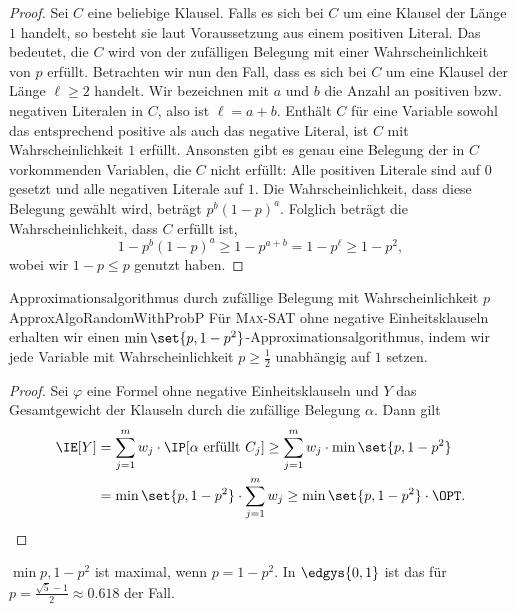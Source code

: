 \documentclass[language=ngerman,algolist]{TemplateLecture}
\begin{document}
\begin{proof}
    Sei $C$ eine beliebige Klausel. Falls es sich bei $C$ um eine Klausel der Länge $1$ handelt, so besteht sie laut Voraussetzung aus einem positiven Literal. Das bedeutet, die $C$ wird von der zufälligen Belegung mit einer Wahrscheinlichkeit von $p$ erfüllt. Betrachten wir nun den Fall, dass es sich bei $C$ um eine Klausel der Länge $\ell \geq 2$ handelt. Wir bezeichnen mit $a$ und $b$ die Anzahl an positiven bzw. negativen Literalen in $C$, also ist $\ell = a + b$. Enthält $C$ für eine Variable sowohl das entsprechend positive als auch das negative Literal, ist $C$ mit Wahrscheinlichkeit $1$ erfüllt. Ansonsten gibt es genau eine Belegung der in $C$ vorkommenden Variablen, die $C$ nicht erfüllt: Alle positiven Literale sind auf $0$ gesetzt und alle negativen Literale auf $1$. Die Wahrscheinlichkeit, dass diese Belegung gewählt wird, beträgt $p^b (1-p)^a$. Folglich beträgt die Wahrscheinlichkeit, dass $C$ erfüllt ist,
    \begin{equation*}
        1 - p^b(1-p)^a \geq 1 - p^{a + b} = 1 - p^{\ell} \geq 1 - p^2,
    \end{equation*}
    wobei wir $1-p \leq p$ genutzt haben.
\end{proof}

\begin{thm}{Approximationsalgorithmus durch zufällige Belegung mit Wahrscheinlichkeit $p$}{ApproxAlgoRandomWithProbP}
    Für \textsc{Max-SAT} ohne negative Einheitsklauseln erhalten wir einen $\min\set{p, 1-p^2}$-Approximationsalgorithmus, indem wir jede Variable mit Wahrscheinlichkeit $p \geq \frac{1}{2}$ unabhängig auf $1$ setzen.
\end{thm}
\begin{proof}
    Sei $\varphi$ eine Formel ohne negative Einheitsklauseln und $Y$ das Gesamtgewicht der Klauseln durch die zufällige Belegung $\alpha$. Dann gilt 
    \begin{equation*}
        \begin{split}
            \IE[Y] &= \sum_{j = 1}^m w_j \cdot \IP[\text{$\alpha$ erfüllt $C_j$}] \geq \sum_{j = 1}^m w_j \cdot \min\set{p, 1-p^2} \\
            &= \min\set{p, 1-p^2} \cdot \sum_{j = 1}^m w_j \geq \min\set{p, 1-p^2} \cdot \OPT. \qedhere
        \end{split}
    \end{equation*}
\end{proof}

$\min{p, 1-p^2}$ ist maximal, wenn $p = 1-p^2$. In $\edgys{0,1}$ ist das für $p = \frac{\sqrt{5} - 1}{2} \approx 0.618$ der Fall. 
\end{document}
